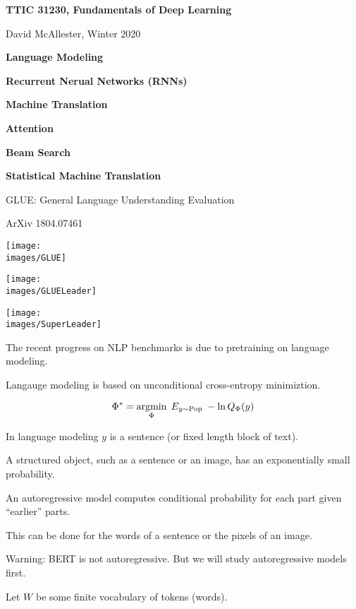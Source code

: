 




{\Huge

  \centerline{\bf TTIC 31230, Fundamentals of Deep Learning}
  \bigskip
  \centerline{David McAllester, Winter 2020}
  \vfill
  \centerline{\bf Language Modeling}
  \vfill
  \centerline{\bf Recurrent Nerual Networks (RNNs)}
  \vfill
  \centerline{\bf Machine Translation}
  \vfill
  \centerline{\bf Attention}
  \vfill
  \centerline{\bf Beam Search}
  \vfill
  \centerline{\bf Statistical Machine Translation}


GLUE: General Language Understanding Evaluation

\vfill

\centerline{\normalsize ArXiv 1804.07461}
\centerline{\texttt{[image: \\images/GLUE]}}


\centerline{\texttt{[image: \\images/GLUELeader]}}


\centerline{\texttt{[image: \\images/SuperLeader]}}


The recent progress on NLP benchmarks is due to pretraining on language modeling.

\vfill
Langauge modeling is based on unconditional cross-entropy minimiztion.

\vfill
$$\Phi^* = \operatorname*{argmin}_\Phi \;E_{y \sim \mathrm{Pop}}\;-\ln Q_\Phi(y)$$

\vfill
In language modeling $y$ is a sentence (or fixed length block of text).


A structured object, such as a sentence or an image, has an exponentially small probability.

\vfill
An autoregressive model computes conditional probability for each part given ``earlier'' parts.

\vfill
This can be done for the words of a sentence or the pixels of an image.

\vfill
Warning: BERT is not autoregressive.  But we will study autoregressive models first.


Let $W$ be some finite vocabulary of tokens (words).

}

